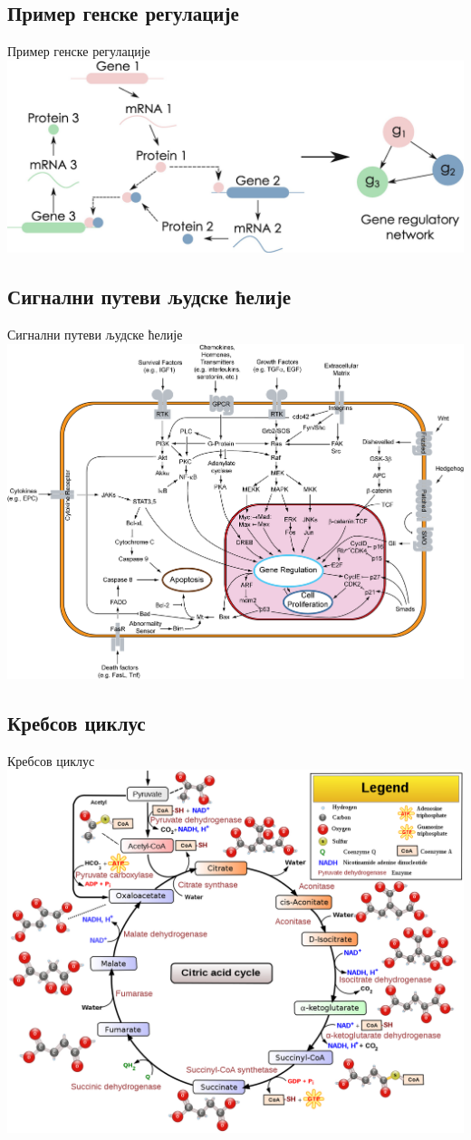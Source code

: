 \documentclass[hyperref={bookmarks=false}]{beamer}
\begin{document}
\subsection{Пример генске регулације}
\begin{frame}{Пример генске регулације}
\centering\includegraphics[width=.95\textwidth]{GRN.jpg}
\end{frame}

\subsection{Сигнални путеви људске ћелије}
\begin{frame}{Сигнални путеви људске ћелије}
\centering\includegraphics[width=.85\textwidth]{STN.png}
\end{frame}

\subsection{Кребсов циклус}
\begin{frame}{Кребсов циклус}
\centering\includegraphics[width=.8\textwidth]{Krebs.png}
\end{frame}
\end{document}
